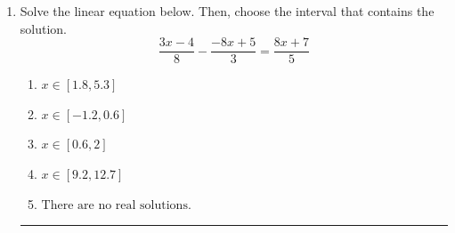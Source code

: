 \documentclass[14pt]{extbook}
\newcommand{\litem}[1]{\item#1\hspace*{-1cm}\rule{\textwidth}{0.4pt}}
\begin{document}
\begin{enumerate}
{\begin{enumerate}[label=\Alph*.]
\end{enumerate} }
\litem{
Solve the linear equation below. Then, choose the interval that contains the solution.\[ \frac{3x -4}{8} - \frac{-8x + 5}{3} = \frac{8x + 7}{5} \]\begin{enumerate}[label=\Alph*.]
\item \( x \in [1.8, 5.3] \)
\item \( x \in [-1.2, 0.6] \)
\item \( x \in [0.6, 2] \)
\item \( x \in [9.2, 12.7] \)
\item \( \text{There are no real solutions.} \)

\end{enumerate} }
\end{enumerate}
\end{document}
